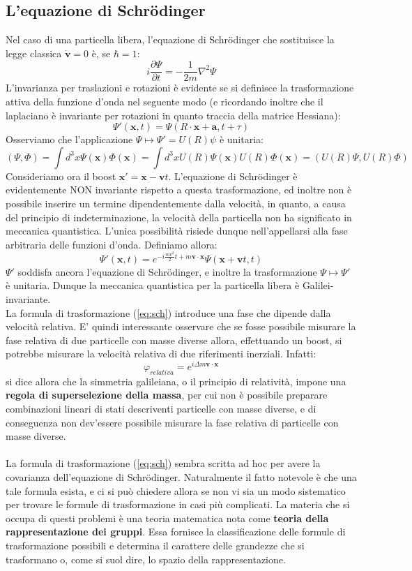 \documentclass[a4paper,11pt]{book}
\theoremstyle{plain}
\theoremstyle{definition}
\begin{document}
\subsection{L'equazione di Schr\"{o}dinger}
Nel caso di una particella libera, l'equazione di Schr\"{o}dinger che sostituisce la legge classica $\dot{\textbf{v}}=0$ è, se $\hbar=1$:
\[
i\frac{\partial \Psi}{\partial t}=-\frac{1}{2m}\nabla^2\Psi
\]
L'invarianza per traslazioni e rotazioni è evidente se si definisce la trasformazione attiva della funzione d'onda nel seguente modo (e ricordando inoltre che il laplaciano è invariante per rotazioni in quanto traccia della matrice Hessiana):
\[
\Psi'(\textbf{x},t)=\Psi(R\cdot \textbf{x}+\textbf{a},t+\tau)
\]
Osserviamo che l'applicazione $\Psi \mapsto \Psi'=U(R)\psi$ è unitaria:
\[
(\Psi,\Phi)=\int d^3x \Psi(\textbf{x})\Phi(\textbf{x})=\int d^3x U(R)\Psi(\textbf{x})U(R)\Phi(\textbf{x})=(U(R)\Psi,U(R)\Phi)
\]
Consideriamo ora il boost $\textbf{x}'=\textbf{x}-\textbf{v}t$. L'equazione di Schr\"{o}dinger è evidentemente NON invariante rispetto a questa trasformazione, ed inoltre non è possibile inserire un termine dipendentemente dalla velocità, in quanto, a causa del principio di indeterminazione, la velocità della particella non ha significato in meccanica quantistica. L'unica possibilità risiede dunque nell'appellarsi alla fase arbitraria delle funzioni d'onda. Definiamo allora:
\begin{equation}\label{eq:sch}
\Psi'(\textbf{x},t)=e^{-i\frac{mv^2}{2}t+m\textbf{v}\cdot \textbf{x}}\Psi(\textbf{x}+\textbf{v}t,t)
\end{equation}
$\Psi'$ soddisfa ancora l'equazione di Schr\"{o}dinger, e inoltre la trasformazione $\Psi\mapsto\Psi'$ è unitaria. Dunque la meccanica quantistica per la particella libera è Galilei-invariante. 
\\
La formula di trasformazione (\ref{eq:sch}) introduce una fase che dipende dalla velocità relativa. E' quindi interessante osservare che se fosse possibile misurare la fase relativa di due particelle con masse diverse allora, effettuando un boost, si potrebbe misurare la velocità relativa di due riferimenti inerziali. Infatti:
\[
\varphi_{relativa}=e^{i\Delta m \textbf{v}\cdot \textbf{x}}
\]
si dice allora che la simmetria galileiana, o il principio di relatività, impone una \textbf{regola di superselezione della massa}, per cui non è possibile preparare combinazioni lineari di stati descriventi particelle con masse diverse, e di conseguenza non dev'essere possibile misurare la fase relativa di particelle con masse diverse. 
\\ \\
La formula di trasformazione (\ref{eq:sch}) sembra scritta ad hoc per avere la 
covarianza dell'equazione di Schr\"{o}dinger. Naturalmente il fatto notevole è che una tale 
formula esista, e ci si può chiedere allora se non vi sia un modo sistematico per trovare 
le formule di trasformazione in casi più complicati. La materia che si occupa di questi 
problemi è una teoria matematica nota come \textbf{teoria della rappresentazione dei gruppi}. Essa 
fornisce la classificazione delle formule di trasformazione possibili e determina il carattere 
delle grandezze che si trasformano o, come si suol dire, lo spazio della rappresentazione. 
\end{document}
